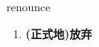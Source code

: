
\begin{frame}
{\huge renounce}
\begin{center}
\begin{enumerate}\Large
  \item \textbf{(正式地)放弃}
\end{enumerate}
\end{center}
\end{frame}
